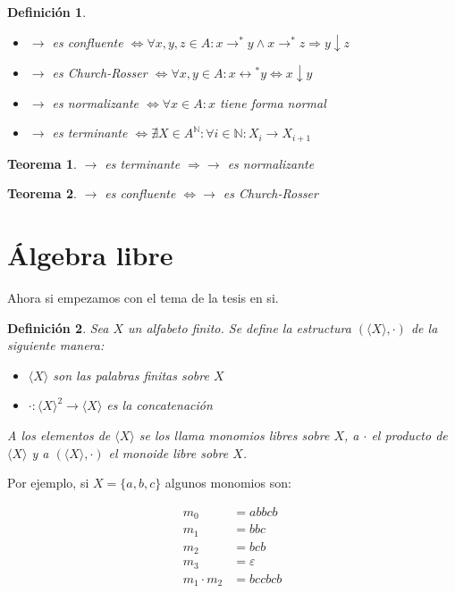 \documentclass{amsbook} %
\theoremstyle{customstyle}
\newtheorem{definition}{Definición}[chapter]
\newtheorem{theorem}{Teorema}[chapter]
\theoremstyle{factstyle}
\begin{document}
\begin{definition}\

\begin{itemize}
\item $→$ es confluente $⇔ ∀x, y, z ∈ A : x →^* y ∧ x →^*z ⇒ y ↓ z$
\item $→$ es Church-Rosser $⇔ ∀x, y ∈ A : x ↔️^* y ⇔ x ↓ y$
\item $→$ es normalizante $⇔ ∀x ∈ A : x$ tiene forma normal
\item $→$ es terminante $⇔ ∄X ∈ A^ℕ : ∀i ∈ ℕ : X_i → X_{i + 1}$
\end{itemize}
\end{definition}

\begin{theorem}\label{thm:terminante ⇒ normalizante}
$→$ es terminante $⇒ →$ es normalizante
\end{theorem}

\begin{theorem}\label{thm:confluente ⇔ Church-Rosser}
$→$ es confluente $⇔ →$ es Church-Rosser
\end{theorem}

\section{Álgebra libre}

Ahora si empezamos con el tema de la tesis en si.

\begin{definition}
Sea $X$ un alfabeto finito. Se define la estructura $(⟨X⟩, ·)$ de la siguiente manera:
\begin{itemize}
\item $⟨X⟩$ son las palabras finitas sobre $X$
\item $· : ⟨X⟩^2 → ⟨X⟩$ es la concatenación
\end{itemize}
A los elementos de $⟨X⟩$ se los llama monomios libres sobre $X$, a $·$ el producto de $⟨X⟩$ y a $(⟨X⟩, ·)$ el monoide libre sobre $X$.
\end{definition}

Por ejemplo, si $X = \{a, b, c\}$ algunos monomios son:

\begin{align*}
m_0 &= abbcb \\
m_1 &= bbc \\
m_2 &= bcb \\
m_3 &= ε \\
m_1 · m_2 &= bccbcb
\end{align*}
\end{document}
